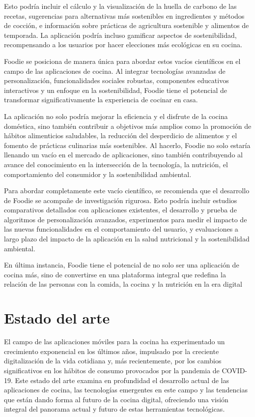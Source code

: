 \documentclass[a4paper,12pt]{article}
\begin{document}
Esto podría incluir el cálculo y la visualización de la huella de carbono de las recetas, sugerencias para alternativas más sostenibles en ingredientes y métodos de cocción, e información sobre prácticas de agricultura sostenible y alimentos de temporada. La aplicación podría incluso gamificar aspectos de sostenibilidad, recompensando a los usuarios por hacer elecciones más ecológicas en su cocina.

Foodie se posiciona de manera única para abordar estos vacíos científicos en el campo de las aplicaciones de cocina. Al integrar tecnologías avanzadas de personalización, funcionalidades sociales robustas, componentes educativos interactivos y un enfoque en la sostenibilidad, Foodie tiene el potencial de transformar significativamente la experiencia de cocinar en casa.

La aplicación no solo podría mejorar la eficiencia y el disfrute de la cocina doméstica, sino también contribuir a objetivos más amplios como la promoción de hábitos alimenticios saludables, la reducción del desperdicio de alimentos y el fomento de prácticas culinarias más sostenibles. Al hacerlo, Foodie no solo estaría llenando un vacío en el mercado de aplicaciones, sino también contribuyendo al avance del conocimiento en la intersección de la tecnología, la nutrición, el comportamiento del consumidor y la sostenibilidad ambiental.

Para abordar completamente este vacío científico, se recomienda que el desarrollo de Foodie se acompañe de investigación rigurosa. Esto podría incluir estudios comparativos detallados con aplicaciones existentes, el desarrollo y prueba de algoritmos de personalización avanzados, experimentos para medir el impacto de las nuevas funcionalidades en el comportamiento del usuario, y evaluaciones a largo plazo del impacto de la aplicación en la salud nutricional y la sostenibilidad ambiental.

En última instancia, Foodie tiene el potencial de no solo ser una aplicación de cocina más, sino de convertirse en una plataforma integral que redefina la relación de las personas con la comida, la cocina y la nutrición en la era digital

\section*{Estado del arte}
El campo de las aplicaciones móviles para la cocina ha experimentado un crecimiento exponencial en los últimos años, impulsado por la creciente digitalización de la vida cotidiana y, más recientemente, por los cambios significativos en los hábitos de consumo provocados por la pandemia de COVID-19. Este estado del arte examina en profundidad el desarrollo actual de las aplicaciones de cocina, las tecnologías emergentes en este campo y las tendencias que están dando forma al futuro de la cocina digital, ofreciendo una visión integral del panorama actual y futuro de estas herramientas tecnológicas.
\end{document}
